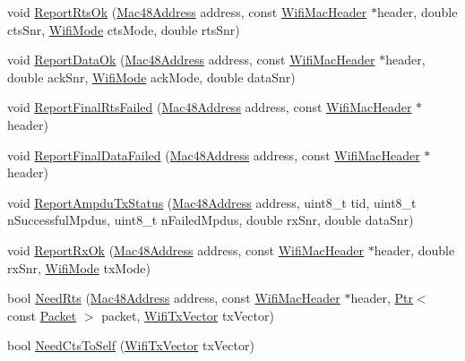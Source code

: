 \begin{DoxyCompactItemize}
\item 
void \hyperlink{classns3_1_1WifiRemoteStationManager_a2425bdf15c98334f1714c75111725fa3}{Report\+Rts\+Ok} (\hyperlink{classns3_1_1Mac48Address}{Mac48\+Address} address, const \hyperlink{classns3_1_1WifiMacHeader}{Wifi\+Mac\+Header} $\ast$header, double cts\+Snr, \hyperlink{classns3_1_1WifiMode}{Wifi\+Mode} cts\+Mode, double rts\+Snr)
\item 
void \hyperlink{classns3_1_1WifiRemoteStationManager_a38c1f44b154a85d4989efa5791aeac04}{Report\+Data\+Ok} (\hyperlink{classns3_1_1Mac48Address}{Mac48\+Address} address, const \hyperlink{classns3_1_1WifiMacHeader}{Wifi\+Mac\+Header} $\ast$header, double ack\+Snr, \hyperlink{classns3_1_1WifiMode}{Wifi\+Mode} ack\+Mode, double data\+Snr)
\item 
void \hyperlink{classns3_1_1WifiRemoteStationManager_ab47024978076386cbfe3f0235bba742b}{Report\+Final\+Rts\+Failed} (\hyperlink{classns3_1_1Mac48Address}{Mac48\+Address} address, const \hyperlink{classns3_1_1WifiMacHeader}{Wifi\+Mac\+Header} $\ast$header)
\item 
void \hyperlink{classns3_1_1WifiRemoteStationManager_a816830f6f7c76615b6f0066f3c5809bd}{Report\+Final\+Data\+Failed} (\hyperlink{classns3_1_1Mac48Address}{Mac48\+Address} address, const \hyperlink{classns3_1_1WifiMacHeader}{Wifi\+Mac\+Header} $\ast$header)
\item 
void \hyperlink{classns3_1_1WifiRemoteStationManager_a9630acb259fe192dfd7606fd459c9cdc}{Report\+Ampdu\+Tx\+Status} (\hyperlink{classns3_1_1Mac48Address}{Mac48\+Address} address, uint8\+\_\+t tid, uint8\+\_\+t n\+Successful\+Mpdus, uint8\+\_\+t n\+Failed\+Mpdus, double rx\+Snr, double data\+Snr)
\item 
void \hyperlink{classns3_1_1WifiRemoteStationManager_a58e79dd3960c03fdd28ee8c0dde03d8f}{Report\+Rx\+Ok} (\hyperlink{classns3_1_1Mac48Address}{Mac48\+Address} address, const \hyperlink{classns3_1_1WifiMacHeader}{Wifi\+Mac\+Header} $\ast$header, double rx\+Snr, \hyperlink{classns3_1_1WifiMode}{Wifi\+Mode} tx\+Mode)
\item 
bool \hyperlink{classns3_1_1WifiRemoteStationManager_a1552c041e2344e355e9a28859054db27}{Need\+Rts} (\hyperlink{classns3_1_1Mac48Address}{Mac48\+Address} address, const \hyperlink{classns3_1_1WifiMacHeader}{Wifi\+Mac\+Header} $\ast$header, \hyperlink{classns3_1_1Ptr}{Ptr}$<$ const \hyperlink{classns3_1_1Packet}{Packet} $>$ packet, \hyperlink{classns3_1_1WifiTxVector}{Wifi\+Tx\+Vector} tx\+Vector)
\item 
bool \hyperlink{classns3_1_1WifiRemoteStationManager_aa3179e61b1a06ff2d0cb0bdbc518e5a2}{Need\+Cts\+To\+Self} (\hyperlink{classns3_1_1WifiTxVector}{Wifi\+Tx\+Vector} tx\+Vector)

\end{DoxyCompactItemize}

